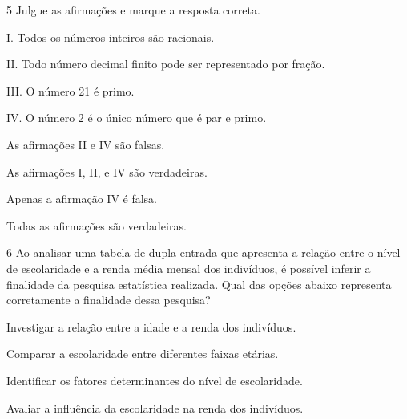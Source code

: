 \num{5} Julgue as afirmações e marque a resposta correta.

I. Todos os números inteiros são racionais.

II. Todo número decimal finito pode ser representado por fração.

III. O número 21 é primo.

IV. O número 2 é o único número que é par e primo.

\begin{escolha}
\item
  As afirmações II e IV são falsas.
\item
  As afirmações I, II, e IV são verdadeiras.
\item
  Apenas a afirmação IV é falsa.
\item
  Todas as afirmações são verdadeiras.
\end{escolha}






\num{6} Ao analisar uma tabela de dupla entrada que apresenta a relação entre
o nível de escolaridade e a renda média mensal dos indivíduos, é
possível inferir a finalidade da pesquisa estatística realizada. Qual
das opções abaixo representa corretamente a finalidade dessa pesquisa?

\begin{escolha}
\item Investigar a relação entre a idade e a renda dos indivíduos.
\item Comparar a escolaridade entre diferentes faixas etárias.
\item Identificar os fatores determinantes do nível de escolaridade.
\item Avaliar a influência da escolaridade na renda dos indivíduos.
\end{escolha}


